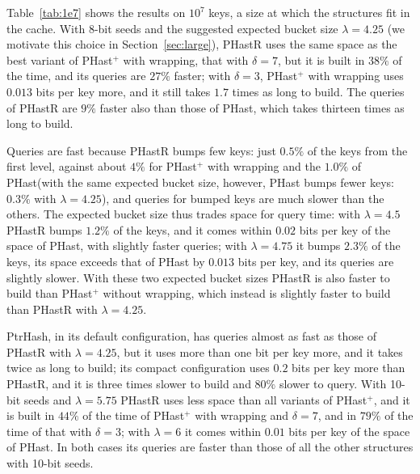 \documentclass[11pt]{article}
\newcommand{\PHast}{PHast\xspace}
\newcommand{\PHastP}{PHast$^+$\xspace}
\newcommand{\PHastR}{PHastR\xspace}
\begin{document}
Table~\ref{tab:1e7} shows the results on $10^7$ keys, a size at which the
structures fit in the cache. With 8-bit seeds and
the suggested expected bucket size $\lambda=4.25$ (we motivate this choice
in Section~\ref{sec:large}), \PHastR uses the same space as the best
variant of \PHastP with wrapping, that with $\delta=7$, but it is built in
$38\%$ of the time, and its queries are $27\%$ faster; with $\delta=3$,
\PHastP with wrapping uses $0.013$ bits per key more, and it still takes
$1.7$ times as long to build. The queries of \PHastR are $9\%$ faster also
than those of \PHast, which takes thirteen times as long to build.

Queries are fast because \PHastR bumps few keys: just $0.5\%$ of the keys
from the first level, against about $4\%$ for \PHastP with wrapping and the
$1.0\%$ of \PHast (with the same expected bucket size,
however, \PHast bumps fewer keys: $0.3\%$ with $\lambda=4.25$), and queries
for bumped keys are much slower than the others. The expected bucket size thus trades space for query
time: with $\lambda=4.5$ \PHastR bumps $1.2\%$ of the keys, and it comes
within $0.02$ bits per key of the space of \PHast, with slightly faster
queries; with $\lambda=4.75$ it bumps $2.3\%$ of the keys, its space exceeds
that of \PHast by $0.013$ bits per key, and its queries are slightly slower.
With these two expected bucket sizes \PHastR is also faster to build than
\PHastP without wrapping, which instead is slightly faster to build than
\PHastR with $\lambda=4.25$. 

PtrHash, in its default configuration, has
queries almost as fast as those of \PHastR with $\lambda=4.25$, but it uses
more than one bit per key more, and it takes twice as long to build; its
compact configuration uses $0.2$ bits per key more than \PHastR, and it is
three times slower to build and $80\%$ slower to query. With 10-bit seeds
and $\lambda=5.75$ \PHastR uses less space than all variants of \PHastP, and
it is built in $44\%$ of the time of \PHastP with wrapping and $\delta=7$,
and in $79\%$ of the time of that with $\delta=3$; with $\lambda=6$ it comes
within $0.01$ bits per key of the space of \PHast. In both cases its queries
are faster than those of all the other structures with 10-bit seeds.
\end{document}
